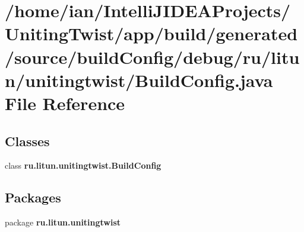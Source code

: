 \section{/home/ian/\+Intelli\+J\+I\+D\+E\+A\+Projects/\+Uniting\+Twist/app/build/generated/source/build\+Config/debug/ru/litun/unitingtwist/\+Build\+Config.java File Reference}
\label{debug_2ru_2litun_2unitingtwist_2_build_config_8java}
\subsection*{Classes}
\begin{DoxyCompactItemize}
\item 
class \textbf{ ru.\+litun.\+unitingtwist.\+Build\+Config}
\end{DoxyCompactItemize}
\subsection*{Packages}
\begin{DoxyCompactItemize}
\item 
package \textbf{ ru.\+litun.\+unitingtwist}
\end{DoxyCompactItemize}
